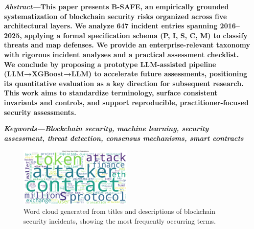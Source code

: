\documentclass[a4paper]{article}
\begin{document}
\begin{multicols}{2}
\setlength{\columnsep}{0.5cm}


\noindent \textbf{\textit{Abstract---}This paper presents B-SAFE, an empirically grounded systematization of blockchain security risks organized across five architectural layers. We analyze 647 incident entries spanning 2016--2025, applying a formal specification schema (P, I, S, C, M) to classify threats and map defenses. We provide an enterprise-relevant taxonomy with rigorous incident analyses and a practical assessment checklist. We conclude by proposing a prototype LLM-assisted pipeline (LLM→XGBoost→LLM) to accelerate future assessments, positioning its quantitative evaluation as a key direction for subsequent research. This work aims to standardize terminology, surface consistent invariants and controls, and support reproducible, practitioner-focused security assessments.}

\small	
\noindent \textbf{\textit{Keywords---}\textit{Blockchain security, machine learning, security assessment, threat detection, consensus mechanisms, smart contracts}}

\begin{figure}[H]
\centering
\includegraphics[width=0.5\textwidth]{../figure/Figure/figures_2/F1_word_cloud.png}
\caption{Word cloud generated from titles and descriptions of blockchain security incidents, showing the most frequently occurring terms.}
\label{fig:five_layer_architecture}
\end{figure}
















\end{multicols}
\end{document}
